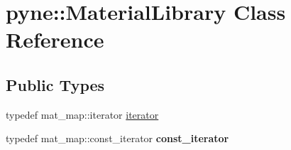 \hypertarget{classpyne_1_1_material_library}{}\section{pyne\+:\+:Material\+Library Class Reference}
\label{classpyne_1_1_material_library}
\subsection*{Public Types}
\begin{DoxyCompactItemize}
\item 
typedef mat\+\_\+map\+::iterator \hyperlink{classpyne_1_1_material_library_abb2c5af112371df0cee26b7fe7d17d89}{iterator}
\item 
\mbox{\label{classpyne_1_1_material_library_a31912e6e89931bc31e0d96a8ca53adcb}} 
typedef mat\+\_\+map\+::const\+\_\+iterator {\bfseries const\+\_\+iterator}
\end{DoxyCompactItemize}
